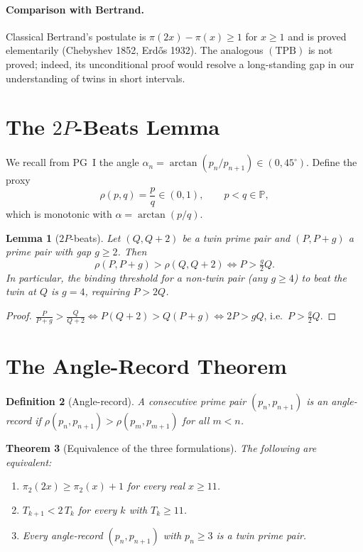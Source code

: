 \documentclass[11pt]{article}
\newtheorem{theorem}{Theorem}
\newtheorem{lemma}[theorem]{Lemma}
\newtheorem{definition}[theorem]{Definition}
\begin{document}
\paragraph{Comparison with Bertrand.}
Classical Bertrand's postulate is $\pi(2x)-\pi(x)\ge 1$ for $x\ge 1$
and is proved elementarily (Chebyshev 1852, Erd\H{o}s 1932). The
analogous $(\mathrm{TPB})$ is not proved; indeed, its unconditional
proof would resolve a long-standing gap in our understanding of twins
in short intervals.

\section{The \texorpdfstring{$2P$}{2P}-Beats Lemma}\label{sec:2P}

We recall from PG~I the angle
$\alpha_n=\arctan(p_n/p_{n+1})\in(0,45^\circ)$. Define the proxy
\[
\rho(p,q)=\frac{p}{q}\in(0,1),\qquad p<q\in\mathbb{P},
\]
which is monotonic with $\alpha=\arctan(p/q)$.

\begin{lemma}[$2P$-beats]\label{lem:2P}
Let $(Q,Q+2)$ be a twin prime pair and $(P,P+g)$ a prime pair with gap
$g\ge 2$. Then
\[
\rho(P,P+g)>\rho(Q,Q+2)\iff P>\tfrac{g}{2}Q.
\]
In particular, the binding threshold for a non-twin pair (any
$g\ge 4$) to beat the twin at $Q$ is $g=4$, requiring $P>2Q$.
\end{lemma}
\begin{proof}
$\frac{P}{P+g}>\frac{Q}{Q+2}\iff P(Q+2)>Q(P+g)\iff 2P>gQ$, i.e.\
$P>\tfrac{g}{2}Q$.
\end{proof}

\section{The Angle-Record Theorem}\label{sec:angle}

\begin{definition}[Angle-record]
A consecutive prime pair $(p_n,p_{n+1})$ is an \emph{angle-record} if
$\rho(p_n,p_{n+1})>\rho(p_m,p_{m+1})$ for all $m<n$.
\end{definition}

\begin{theorem}[Equivalence of the three formulations]
\label{thm:equiv}
The following are equivalent:
\begin{enumerate}
\item[(i)] $\pi_2(2x)\ge\pi_2(x)+1$ for every real $x\ge 11$.
\item[(ii)] $T_{k+1}<2\,T_k$ for every $k$ with $T_k\ge 11$.
\item[(iii)] Every angle-record $(p_n,p_{n+1})$ with $p_n\ge 3$ is a
twin prime pair.
\end{enumerate}
\end{theorem}
\end{document}
